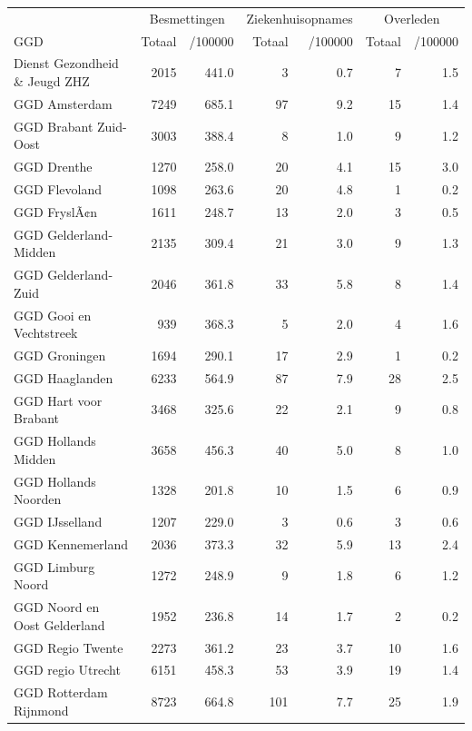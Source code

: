 \documentclass[
  english,
  man,floatsintext]{apa6}
\begin{document}
\begin{table}[H]
\centering\begingroup\fontsize{10}{12}\selectfont

\begin{threeparttable}
\begin{tabular}{lrrrrrr}
\toprule
\multicolumn{1}{c}{ } & \multicolumn{2}{c}{Besmettingen} & \multicolumn{2}{c}{Ziekenhuisopnames} & \multicolumn{2}{c}{Overleden} \\
\cmidrule(l{3pt}r{3pt}){2-3} \cmidrule(l{3pt}r{3pt}){4-5} \cmidrule(l{3pt}r{3pt}){6-7}
GGD & Totaal & /100000 & Totaal & /100000 & Totaal & /100000\\
\midrule
Dienst Gezondheid \& Jeugd ZHZ & 2015 & 441.0 & 3 & 0.7 & 7 & 1.5\\
GGD Amsterdam & 7249 & 685.1 & 97 & 9.2 & 15 & 1.4\\
GGD Brabant Zuid-Oost & 3003 & 388.4 & 8 & 1.0 & 9 & 1.2\\
GGD Drenthe & 1270 & 258.0 & 20 & 4.1 & 15 & 3.0\\
GGD Flevoland & 1098 & 263.6 & 20 & 4.8 & 1 & 0.2\\
GGD FryslÃ¢n & 1611 & 248.7 & 13 & 2.0 & 3 & 0.5\\
GGD Gelderland-Midden & 2135 & 309.4 & 21 & 3.0 & 9 & 1.3\\
GGD Gelderland-Zuid & 2046 & 361.8 & 33 & 5.8 & 8 & 1.4\\
GGD Gooi en Vechtstreek & 939 & 368.3 & 5 & 2.0 & 4 & 1.6\\
GGD Groningen & 1694 & 290.1 & 17 & 2.9 & 1 & 0.2\\
GGD Haaglanden & 6233 & 564.9 & 87 & 7.9 & 28 & 2.5\\
GGD Hart voor Brabant & 3468 & 325.6 & 22 & 2.1 & 9 & 0.8\\
GGD Hollands Midden & 3658 & 456.3 & 40 & 5.0 & 8 & 1.0\\
GGD Hollands Noorden & 1328 & 201.8 & 10 & 1.5 & 6 & 0.9\\
GGD IJsselland & 1207 & 229.0 & 3 & 0.6 & 3 & 0.6\\
GGD Kennemerland & 2036 & 373.3 & 32 & 5.9 & 13 & 2.4\\
GGD Limburg Noord & 1272 & 248.9 & 9 & 1.8 & 6 & 1.2\\
GGD Noord en Oost Gelderland & 1952 & 236.8 & 14 & 1.7 & 2 & 0.2\\
GGD Regio Twente & 2273 & 361.2 & 23 & 3.7 & 10 & 1.6\\
GGD regio Utrecht & 6151 & 458.3 & 53 & 3.9 & 19 & 1.4\\
GGD Rotterdam Rijnmond & 8723 & 664.8 & 101 & 7.7 & 25 & 1.9\\

\end{tabular}
\end{threeparttable}
\end{table}
\end{document}
